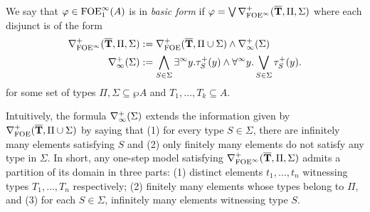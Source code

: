 \begin{definition}
We say that $\varphi \in \mathrm{FOE}^{\infty}_1(A)$ is in \emph{basic form} if $\varphi = \bigvee \nabla^+_{\mathrm{FOE}^{\infty}}(\overline{{\mathbf{T}}},\Pi,\Sigma)$ where each disjunct is of the form
\begin{align*}
	\nabla^+_{\mathrm{FOE}^{\infty}}(\overline{{\mathbf{T}}},\Pi,\Sigma) &:= \nabla^+_{\mathrm{FOE}}(\overline{{\mathbf{T}}},\Pi \cup \Sigma) \land \nabla^+_\infty(\Sigma)\\
	\nabla^+_\infty(\Sigma) &:= \bigwedge_{S\in\Sigma} \exists^\infty y.\tau^{+}_S(y) \land \forall^\infty y.\bigvee_{S\in\Sigma} \tau^{+}_S(y) .
\end{align*}
for some set of types $\Pi,\Sigma \subseteq \wp A$ and $T_1, \dots, T_k \subseteq A$.
\end{definition}

Intuitively, the formula $\nabla^+_\infty(\Sigma)$ extends the information given by $\nabla^+_{\mathrm{FOE}}(\overline{{\mathbf{T}}},\Pi \cup \Sigma)$ by saying that (1) for every type $S\in\Sigma$, there are infinitely many elements satisfying $S$ and (2) only finitely many elements do not satisfy any type in $\Sigma$. In short, any one-step model satisfying $\nabla^+_{\mathrm{FOE}^{\infty}}(\overline{{\mathbf{T}}},\Pi,\Sigma)$ admits a partition of its domain in three parts: (1) distinct elements $t_1,\dots,t_n$ witnessing types $T_1,\dots,T_n$ respectively; (2) finitely many elements whose types belong to $\Pi$, and (3) for each $S\in \Sigma$, infinitely many elements witnessing type $S$.



